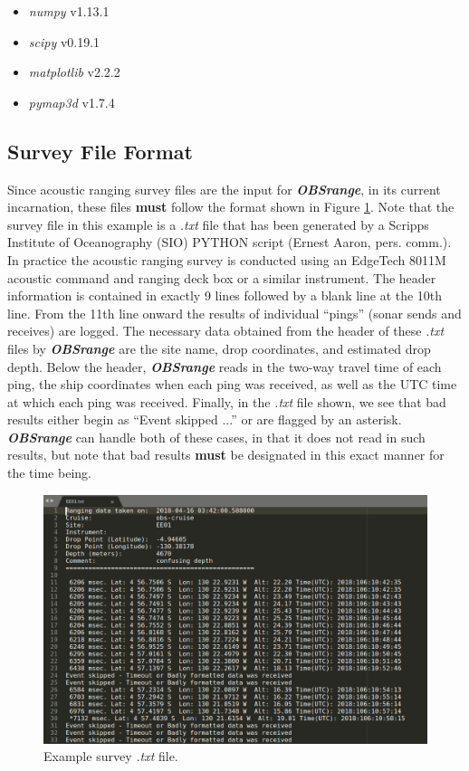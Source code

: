 \documentclass[titlepage, 12pt]{article}
\begin{document}
  \begin{itemize}
   \item \textit{numpy} v1.13.1
   \item \textit{scipy} v0.19.1
   \item \textit{matplotlib} v2.2.2
   \item \textit{pymap3d} v1.7.4
  \end{itemize}

  \subsection{Survey File Format}
  Since acoustic ranging survey files are the input for \textit{\textbf{OBSrange}}, in its current incarnation, these files \textbf{must} follow the format shown in Figure \ref{fig:surveyfle}. Note that the survey file in this example is a \textit{.txt} file that has been generated by a Scripps Institute of Oceanography (SIO) PYTHON script (Ernest Aaron, pers. comm.). In practice the acoustic ranging survey is conducted using an EdgeTech 8011M acoustic command and ranging deck box or a similar instrument. The header information is contained in exactly 9 lines followed by a blank line at the 10th line. From the 11th line onward the results of individual “pings” (sonar sends and receives) are logged. The necessary data obtained from the header of these \textit{.txt} files by \textit{\textbf{OBSrange}} are the site name, drop coordinates, and estimated drop depth. Below the header, \textit{\textbf{OBSrange}} reads in the two-way travel time of each ping, the ship coordinates when each ping was received, as well as the UTC time at which each ping was received. Finally, in the  \textit{.txt} file shown, we see that bad results either begin as ``Event skipped ...'' or are flagged by an asterisk. \textit{\textbf{OBSrange}} can handle both of these cases, in that it does not read in such results, but note that bad results \textbf{must} be designated in this exact manner for the time being.

  \begin{figure}[!htb]
   \includegraphics[width=\linewidth]{survey_fle_ex.png}
   \caption{Example survey \textit{.txt} file.}
   \label{fig:surveyfle}
  \end{figure} 
  
\end{document}

